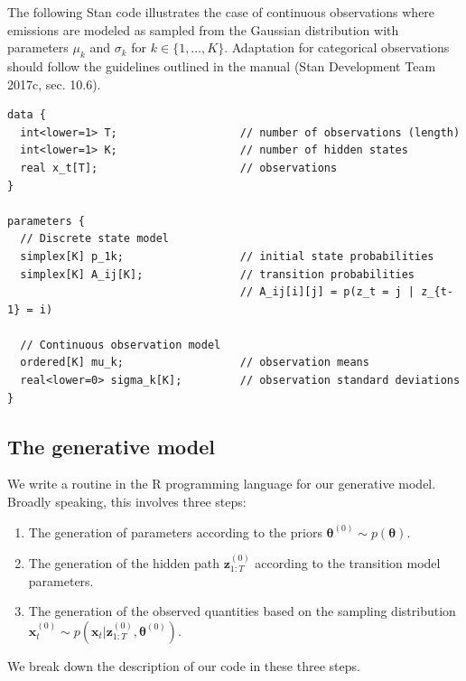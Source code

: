 \documentclass[]{article}
\providecommand{\tightlist}{%
  \setlength{\itemsep}{0pt}\setlength{\parskip}{0pt}}
\newcommand{\mat}[1]{\mathbf{#1}}
\begin{document}
The following Stan code illustrates the case of continuous observations
where emissions are modeled as sampled from the Gaussian distribution
with parameters \(\mu_k\) and \(\sigma_k\) for
\(k \in \{1, \dots, K\}\). Adaptation for categorical observations
should follow the guidelines outlined in the manual (Stan Development
Team 2017c, sec. 10.6).

\begin{verbatim}
data {
  int<lower=1> T;                   // number of observations (length)
  int<lower=1> K;                   // number of hidden states
  real x_t[T];                      // observations
}

parameters {
  // Discrete state model
  simplex[K] p_1k;                  // initial state probabilities
  simplex[K] A_ij[K];               // transition probabilities
                                    // A_ij[i][j] = p(z_t = j | z_{t-1} = i)

  // Continuous observation model
  ordered[K] mu_k;                  // observation means
  real<lower=0> sigma_k[K];         // observation standard deviations
}
\end{verbatim}

\subsection{The generative model}\label{the-generative-model}

We write a routine in the R programming language for our generative
model. Broadly speaking, this involves three steps:

\begin{enumerate}
\def\labelenumi{\arabic{enumi}.}
\tightlist
\item
  The generation of parameters according to the priors
  \(\mat{\theta}^{(0)} \sim p(\mat{\theta})\).
\item
  The generation of the hidden path \(\mat{z}_{1:T}^{(0)}\) according to
  the transition model parameters.
\item
  The generation of the observed quantities based on the sampling
  distribution
  \(\mat{x}_t^{(0)} \sim p(\mat{x}_t | \mat{z}_{1:T}^{(0)}, \mat{\theta}^{(0)})\).
\end{enumerate}

We break down the description of our code in these three steps.
\end{document}
